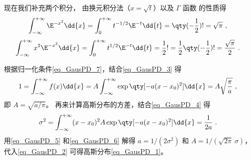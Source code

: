 现在我们补充两个积分， 由换元积分法（$x=\sqrt{t}$）以及 $\Gamma$ 函数 的性质得
\begin{equation}\label{eq_GausPD_3}
\int_{-\infty }^{+\infty } \E^{-x^2}\dd{x}  = \int_0^{+\infty} t^{-1/2}\E^{ - t} \dd{t}  = \qty(-\frac12)! = \sqrt \pi ~,
\end{equation}
\begin{equation}\label{eq_GausPD_4}
\int_{-\infty}^{+\infty} x^2 \E^{-x^2}\dd{x}  = \int_0^{+\infty} t^{1/2}\E^{-t} \dd{t}  = \frac12 ! = \frac12 \qty(-\frac12)! = \frac{\sqrt\pi}{2}~.
\end{equation}

根据归一化条件\autoref{eq_GausPD_7}，结合\autoref{eq_GausPD_3} 得
\begin{equation}\label{eq_GausPD_5}
1 = \int_{-\infty}^{+\infty} f(x) \dd{x}  = A\int_{-\infty}^{+\infty} \exp\qty[-a (x - x_0)^2] \dd{x}  = A\sqrt{\frac{\pi}{a}}~,
\end{equation}
即 $A = \sqrt{a/\pi}$。 再来计算高斯分布的方差，结合\autoref{eq_GausPD_4} 得
\begin{equation}\label{eq_GausPD_6}
\sigma ^2 = \int_{-\infty}^{+\infty} (x - x_0)^2 A\exp\qty[-a (x - x_0)^2] \dd{x}  = \frac{1}{2a}~.
\end{equation}
用\autoref{eq_GausPD_5} 和\autoref{eq_GausPD_6} 解得 $a = 1/(2\sigma^2)$ 和 $A = 1/(\sqrt{2\pi}\ \sigma)$，代入\autoref{eq_GausPD_2} 可得高斯分布\autoref{eq_GausPD_1}。

